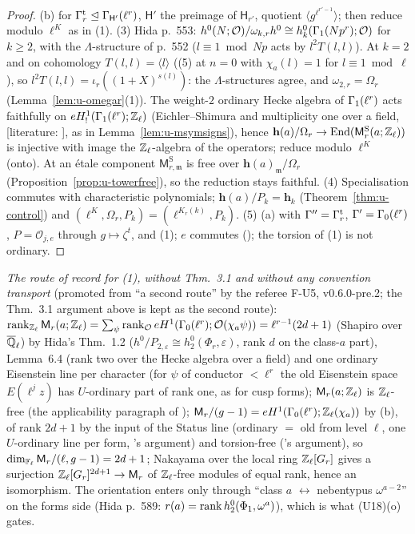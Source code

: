 \documentclass[11pt]{article}
\newcommand{\LIT}[1]{\textsf{[literature: #1]}}   %
\newcommand{\Iw}{\Lambda}                         %
\newcommand{\hcusp}{\mathbf{h}}                   %
\newcommand{\Pk}[1]{P_{#1}}                       %
\newcommand{\cusp}{\mathrm{S}}
\newcommand{\Qlb}{\overline{\Q}_\ell}
\newcommand{\Zl}{\Z_\ell}
\newcommand{\GaT}[1]{\Ga^{\mathrm t}_{#1}}            %
\newcommand{\Om}[1]{\Omega_{#1}}                      %
\begin{document}
\begin{proof}
(b) for $\GaT r\trianglelefteq\Ga_{\mathsf H'}(\ell^{r})$, $\mathsf H'$ the preimage of $\mathsf H_{r'}$, quotient $\langle g^{\ell^{r'-1}}\rangle$; then reduce modulo $\ell^{K}$ as in (1).
(3) Hida p.~553: $h^{0}(N;\mathcal O)/\omega_{k,r}h^{0}\cong h^{0}_k(\Gamma_1(Np^{r});\mathcal O)$ for $k\ge2$, with the $\Iw$-structure of p.~552 ($l\equiv1\bmod Np$ acts by $l^{2}T(l,l)$). At $k=2$ and on
cohomology $T(l,l)=\langle l\rangle$ ((5) at $n=0$ with $\chi_a(l)=1$ for $l\equiv1\bmod\ell$), so $l^{2}T(l,l)=\iota_r((1+X)^{s(l)})$: the $\Iw$-structures agree, and $\omega_{2,r}=\Om r$
(Lemma~\ref{lem:u-omegar}(1)). The weight-$2$ ordinary Hecke algebra of $\Gamma_1(\ell^{r})$ acts faithfully on $eH^{1}_{!}(\Ga_1(\ell^{r});\Zl)$ (Eichler--Shimura and multiplicity one over a field,
\LIT{\cite[Lemma~6.4, pp.~587--588]{hida_invent}}, as in Lemma~\ref{lem:u-msymsigns}), hence $\hcusp(a)/\Om r\to\End(\mathsf M^{\cusp}_r(a;\Zl))$ is injective with image the $\Zl$-algebra of the operators;
reduce modulo $\ell^{K}$ (onto). At an étale component $\mathsf M^{\cusp}_{r,\mathfrak m}$ is free over $\hcusp(a)_{\mathfrak m}/\Om r$ (Proposition~\ref{prop:u-towerfree}), so the reduction stays faithful.
(4) Specialisation commutes with characteristic polynomials; $\hcusp(a)/\Pk k=\hcusp_k$ (Theorem~\ref{thm:u-control}) and $(\ell^{K},\Om r,\Pk k)=(\ell^{K_r(k)},\Pk k)$. (5) (a) with
$\Ga''=\GaT r$, $\Gamma'=\Gamma_0(\ell^{r})$, $P=\mathcal O_{j,e}$ through $g\mapsto\zeta^{t}$, and (1); $e$ commutes (); the torsion of (1) is not ordinary.
\end{proof}

\noindent\emph{The route of record for (1), without Thm.~3.1 and without any convention transport} (promoted from ``a second route'' by the referee F-U5, v0.6.0-pre.2; the Thm.~3.1 argument above
is kept as the second route): $\rank_{\Zl}\mathsf M_r(a;\Zl)=\sum_\psi\rank_{\mathcal O}eH^{1}(\Ga_0(\ell^{r});\mathcal O(\chi_a\psi))=\ell^{r-1}(2d+1)$ (Shapiro over $\Qlb$) by Hida's
Thm.~1.2 ($h^{0}/P_{2,\varepsilon}\cong h^{0}_2(\Phi_r,\varepsilon)$, rank $d$ on the class-$a$ part), Lemma~6.4 (rank two over the Hecke algebra over a field) and one ordinary Eisenstein line per
character (for $\psi$ of conductor $<\ell^{r}$ the old Eisenstein space $E(\ell^{j}z)$ has $U$-ordinary part of rank one, as for cusp forms); $\mathsf M_r(a;\Zl)$ is $\Zl$-free (the applicability
paragraph of ); $\mathsf M_r/(g-1)=eH^{1}(\Ga_0(\ell^{r});\Zl(\chi_a))$ by (b), of rank $2d+1$ by the \STD{} input of the Status line (ordinary $=$ old from level
$\ell$, one $U$-ordinary line per form, 's argument) and torsion-free ('s argument), so $\dim_{\mathbb{F}_\ell}\mathsf M_r/(\ell,g-1)=2d+1$; Nakayama over the local
ring $\Zl[G_r]$ gives a surjection $\Zl[G_r]^{2d+1}\to\mathsf M_r$ of $\Zl$-free modules of equal rank, hence an isomorphism. The orientation enters only through ``class $a$ $\leftrightarrow$
nebentypus $\omega^{a-2}$'' on the forms side (Hida p.~589: $r(a)=\operatorname{rank} h^{0}_2(\Phi_1,\omega^{a})$), which is what (U18)(o) gates.
\end{document}
